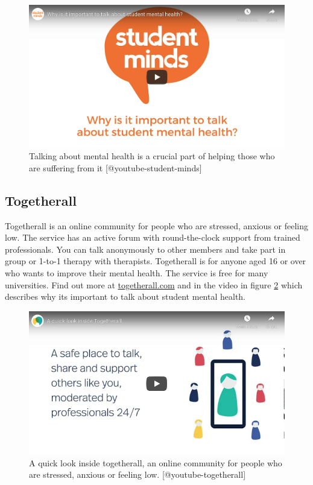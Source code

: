 \documentclass[
]{book}
\begin{document}
\begin{figure}

{\centering \includegraphics[width=0.99\linewidth]{images/youtube-student-minds} 

}

\caption{Talking about mental health is a crucial part of helping those who are suffering from it [@youtube-student-minds]}\label{fig:studentminds-fig}
\end{figure}

\hypertarget{togetherall}{%
\subsection{Togetherall}\label{togetherall}}

Togetherall is an online community for people who are stressed, anxious or feeling low. The service has an active forum with round-the-clock support from trained professionals. You can talk anonymously to other members and take part in group or 1-to-1 therapy with therapists. Togetherall is for anyone aged 16 or over who wants to improve their mental health. The service is free for many universities. Find out more at \href{https://togetherall.com/}{togetherall.com} and in the video in figure \ref{fig:togetherall-fig} which describes why its important to talk about student mental health.

\begin{figure}

{\centering \includegraphics[width=0.99\linewidth]{images/youtube-togetherall} 

}

\caption{A quick look inside togetherall, an online community for people who are stressed, anxious or feeling low. [@youtube-togetherall]}\label{fig:togetherall-fig}
\end{figure}
\end{document}
